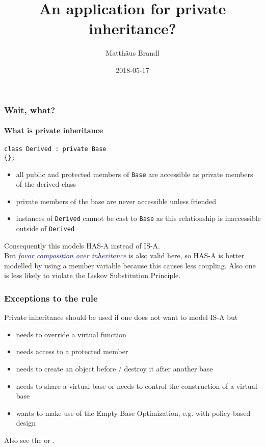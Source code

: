 \documentclass{beamer}
\title{An application for private inheritance?}
\author{Matth\"aus Brandl}
\institute{EOS GmbH}
\date{2018-05-17}
\def\code#1{\texttt{#1}}
\def\cite#1{\textit{\textcolor{blue}{#1}}}
\begin{document}
\frame{\titlepage}

\begin{frame}[fragile]
\frametitle{Wait, what?}
\framesubtitle{What is private inheritance}

\begin{lstlisting}
class Derived : private Base
{};
\end{lstlisting}

\begin{itemize}
\item all public and protected members of \code{Base} are accessible as private members of the derived class
\item private members of the base are never accessible unless friended
\item instances of \code{Derived} cannot be cast to \code{Base} as this relationship is inaccessible outside of \code{Derived}
\end{itemize}

Consequently this models HAS-A instead of IS-A.\\
But \cite{favor composition over inheritance} is also valid here, so HAS-A is better modelled by using a member variable because this causes less coupling. Also one is less likely to violate the Liskov Substitution Principle.

\end{frame}

\begin{frame}[fragile]
\frametitle{Exceptions to the rule}
Private inheritance should be used if one does not want to model IS-A but
\begin{itemize}
\item needs to override a virtual function
\item needs access to a protected member
\item needs to create an object before / destroy it after another base
\item needs to share a virtual base or needs to control the construction of a virtual base
\item wants to make use of the Empty Base Optimization, e.g. with policy-based design
\end{itemize}

Also see the \href{https://isocpp.org/wiki/faq/private-inheritance}{} or \href{https://en.cppreference.com/w/cpp/language/derived_class%23Private_inheritance}{\beamergotobutton{cppreference.com}}.
\end{frame}
\end{document}
